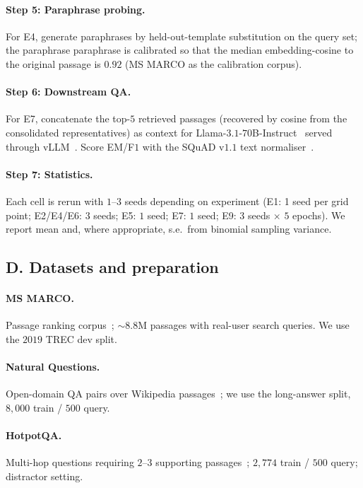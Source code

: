 \paragraph{Step 5: Paraphrase probing.} For E4, generate paraphrases
by held-out-template substitution on the query set; the paraphrase
paraphrase is calibrated so that the median embedding-cosine to the
original passage is $0.92$ (MS MARCO as the calibration corpus).

\paragraph{Step 6: Downstream QA.} For E7, concatenate the top-$5$
retrieved passages (recovered by cosine from the consolidated
representatives) as context for
Llama-$3.1$-$70$B-Instruct~\cite{llama31} served through
vLLM~\cite{kwon2023vllm}. Score EM/F$1$ with the SQuAD v$1.1$ text
normaliser~\cite{rajpurkar2016squad}.

\paragraph{Step 7: Statistics.} Each cell is rerun with $1$--$3$
seeds depending on experiment (E1: 1 seed per grid point; E2/E4/E6:
$3$ seeds; E5: $1$ seed; E7: $1$ seed; E9: $3$ seeds $\times$ $5$
epochs). We report mean and, where appropriate, s.e.\ from binomial
sampling variance.

\subsection*{D. Datasets and preparation}
\label{sec:methods:datasets}

\paragraph{MS MARCO.} Passage ranking corpus~\cite{nguyen2016msmarco};
$\sim 8.8$M passages with real-user search queries. We use the $2019$
TREC dev split.

\paragraph{Natural Questions.} Open-domain QA pairs over Wikipedia
passages~\cite{kwiatkowski2019nq}; we use the long-answer split,
$8{,}000$ train / $500$ query.

\paragraph{HotpotQA.} Multi-hop questions requiring $2$--$3$
supporting passages~\cite{yang2018hotpotqa}; $2{,}774$ train /
$500$ query; distractor setting.

